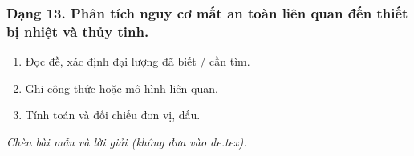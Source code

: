 \subsubsection{Dạng 13. Phân tích nguy cơ mất an toàn liên quan đến thiết bị nhiệt và thủy tinh.}
\begin{phuongphap}
\begin{enumerate}
\item Đọc đề, xác định đại lượng đã biết / cần tìm.
\item Ghi công thức hoặc mô hình liên quan.
\item Tính toán và đối chiếu đơn vị, dấu.
\end{enumerate}
\end{phuongphap}
\begin{vidumau}
\textit{Chèn bài mẫu và lời giải (không đưa vào de.tex).}
\end{vidumau}

